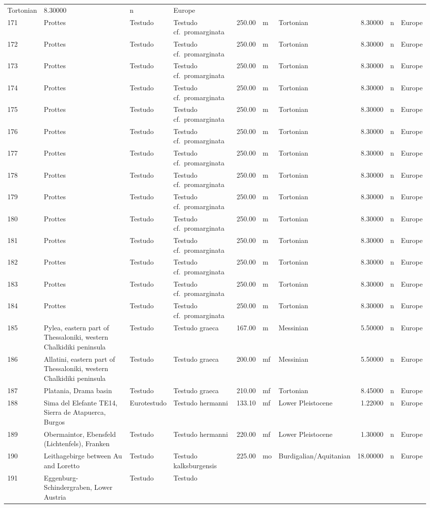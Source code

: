 \documentclass[]{article}
\begin{document}
\begin{longtable}[]{@{}llllrllrll@{}}
Tortonian & 8.30000 & n & Europe\tabularnewline
171 & Prottes & Testudo & Testudo cf.~promarginata & 250.00 & m &
Tortonian & 8.30000 & n & Europe\tabularnewline
172 & Prottes & Testudo & Testudo cf.~promarginata & 250.00 & m &
Tortonian & 8.30000 & n & Europe\tabularnewline
173 & Prottes & Testudo & Testudo cf.~promarginata & 250.00 & m &
Tortonian & 8.30000 & n & Europe\tabularnewline
174 & Prottes & Testudo & Testudo cf.~promarginata & 250.00 & m &
Tortonian & 8.30000 & n & Europe\tabularnewline
175 & Prottes & Testudo & Testudo cf.~promarginata & 250.00 & m &
Tortonian & 8.30000 & n & Europe\tabularnewline
176 & Prottes & Testudo & Testudo cf.~promarginata & 250.00 & m &
Tortonian & 8.30000 & n & Europe\tabularnewline
177 & Prottes & Testudo & Testudo cf.~promarginata & 250.00 & m &
Tortonian & 8.30000 & n & Europe\tabularnewline
178 & Prottes & Testudo & Testudo cf.~promarginata & 250.00 & m &
Tortonian & 8.30000 & n & Europe\tabularnewline
179 & Prottes & Testudo & Testudo cf.~promarginata & 250.00 & m &
Tortonian & 8.30000 & n & Europe\tabularnewline
180 & Prottes & Testudo & Testudo cf.~promarginata & 250.00 & m &
Tortonian & 8.30000 & n & Europe\tabularnewline
181 & Prottes & Testudo & Testudo cf.~promarginata & 250.00 & m &
Tortonian & 8.30000 & n & Europe\tabularnewline
182 & Prottes & Testudo & Testudo cf.~promarginata & 250.00 & m &
Tortonian & 8.30000 & n & Europe\tabularnewline
183 & Prottes & Testudo & Testudo cf.~promarginata & 250.00 & m &
Tortonian & 8.30000 & n & Europe\tabularnewline
184 & Prottes & Testudo & Testudo cf.~promarginata & 250.00 & m &
Tortonian & 8.30000 & n & Europe\tabularnewline
185 & Pylea, eastern part of Thessaloniki, western Chalkidiki peninsula
& Testudo & Testudo graeca & 167.00 & m & Messinian & 5.50000 & n &
Europe\tabularnewline
186 & Allatini, eastern part of Thessaloniki, western Chalkidiki
peninsula & Testudo & Testudo graeca & 200.00 & mf & Messinian & 5.50000
& n & Europe\tabularnewline
187 & Platania, Drama basin & Testudo & Testudo graeca & 210.00 & mf &
Tortonian & 8.45000 & n & Europe\tabularnewline
188 & Sima del Elefante TE14, Sierra de Atapuerca, Burgos & Eurotestudo
& Testudo hermanni & 133.10 & mf & Lower Pleistocene & 1.22000 & n &
Europe\tabularnewline
189 & Obermaintor, Ebensfeld (Lichtenfels), Franken & Testudo & Testudo
hermanni & 220.00 & mf & Lower Pleistocene & 1.30000 & n &
Europe\tabularnewline
190 & Leithagebirge between Au and Loretto & Testudo & Testudo
kalksburgensis & 225.00 & mo & Burdigalian/Aquitanian & 18.00000 & n &
Europe\tabularnewline
191 & Eggenburg-Schindergraben, Lower Austria & Testudo & Testudo

\end{longtable}
\end{document}
